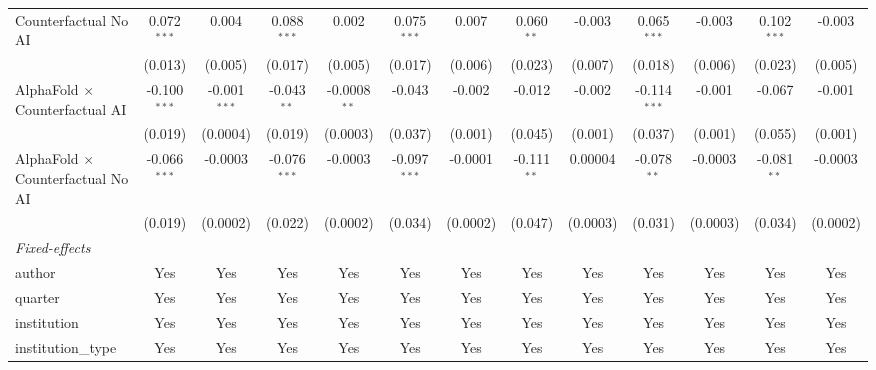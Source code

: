 \begin{tabular}{lcccccccccccc}
   Counterfactual No AI                     & 0.072$^{***}$  & 0.004          & 0.088$^{***}$  & 0.002          & 0.075$^{***}$  & 0.007         & 0.060$^{**}$  & -0.003       & 0.065$^{***}$  & -0.003        & 0.102$^{***}$ & -0.003\\   
                                            & (0.013)        & (0.005)        & (0.017)        & (0.005)        & (0.017)        & (0.006)       & (0.023)       & (0.007)      & (0.018)        & (0.006)       & (0.023)       & (0.005)\\   
   AlphaFold $\times$ Counterfactual AI     & -0.100$^{***}$ & -0.001$^{***}$ & -0.043$^{**}$  & -0.0008$^{**}$ & -0.043         & -0.002        & -0.012        & -0.002       & -0.114$^{***}$ & -0.001        & -0.067        & -0.001\\   
                                            & (0.019)        & (0.0004)       & (0.019)        & (0.0003)       & (0.037)        & (0.001)       & (0.045)       & (0.001)      & (0.037)        & (0.001)       & (0.055)       & (0.001)\\   
   AlphaFold $\times$ Counterfactual No AI  & -0.066$^{***}$ & -0.0003        & -0.076$^{***}$ & -0.0003        & -0.097$^{***}$ & -0.0001       & -0.111$^{**}$ & 0.00004      & -0.078$^{**}$  & -0.0003       & -0.081$^{**}$ & -0.0003\\   
                                            & (0.019)        & (0.0002)       & (0.022)        & (0.0002)       & (0.034)        & (0.0002)      & (0.047)       & (0.0003)     & (0.031)        & (0.0003)      & (0.034)       & (0.0002)\\   
   \midrule
   \emph{Fixed-effects}\\
   author                                   & Yes            & Yes            & Yes            & Yes            & Yes            & Yes           & Yes           & Yes          & Yes            & Yes           & Yes           & Yes\\  
   quarter                                  & Yes            & Yes            & Yes            & Yes            & Yes            & Yes           & Yes           & Yes          & Yes            & Yes           & Yes           & Yes\\  
   institution                              & Yes            & Yes            & Yes            & Yes            & Yes            & Yes           & Yes           & Yes          & Yes            & Yes           & Yes           & Yes\\  
   institution\_type                        & Yes            & Yes            & Yes            & Yes            & Yes            & Yes           & Yes           & Yes          & Yes            & Yes           & Yes           & Yes\\  

\end{tabular}

